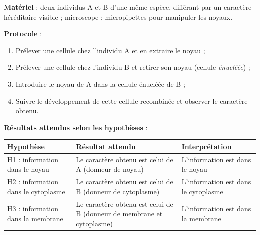 \documentclass[11pt]{article}
\begin{document}
\begin{experience}
\textbf{Matériel} : deux individus A et B d'une même espèce, différant par un caractère héréditaire visible ; microscope ; micropipettes pour manipuler les noyaux.

\textbf{Protocole} :
\begin{enumerate}
\item Prélever une cellule chez l'individu A et en extraire le noyau ;
\item Prélever une cellule chez l'individu B et retirer son noyau (cellule \emph{énucléée}) ;
\item Introduire le noyau de A dans la cellule énucléée de B ;
\item Suivre le développement de cette cellule recombinée et observer le caractère obtenu.
\end{enumerate}

\textbf{Résultats attendus selon les hypothèses} :
\begin{center}
\begin{tabularx}{\linewidth}{|l|X|X|}
\hline
\rowcolor{popblueL} \textbf{Hypothèse} & \textbf{Résultat attendu} & \textbf{Interprétation} \\
\hline
H1 : information dans le noyau & Le caractère obtenu est celui de A (donneur de noyau) & L'information est dans le noyau \\
\hline
H2 : information dans le cytoplasme & Le caractère obtenu est celui de B (donneur de cytoplasme) & L'information est dans le cytoplasme \\
\hline
H3 : information dans la membrane & Le caractère obtenu est celui de B (donneur de membrane et cytoplasme) & L'information est dans la membrane \\
\hline
\end{tabularx}
\end{center}
\end{experience}
\end{document}
